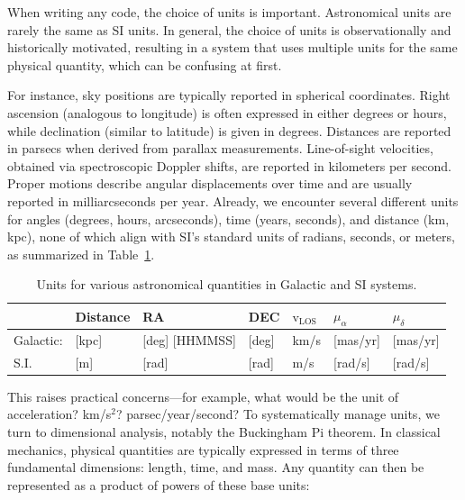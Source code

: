     When writing any code, the choice of units is important. Astronomical units are rarely the same as SI units. In general, the choice of units is observationally and historically motivated, resulting in a system that uses multiple units for the same physical quantity, which can be confusing at first.

    For instance, sky positions are typically reported in spherical coordinates. Right ascension (analogous to longitude) is often expressed in either degrees or hours, while declination (similar to latitude) is given in degrees. Distances are reported in parsecs when derived from parallax measurements. Line-of-sight velocities, obtained via spectroscopic Doppler shifts, are reported in kilometers per second. Proper motions describe angular displacements over time and are usually reported in milliarcseconds per year. Already, we encounter several different units for angles (degrees, hours, arcseconds), time (years, seconds), and distance (km, kpc), none of which align with SI’s standard units of radians, seconds, or meters, as summarized in Table~\ref{tab:units}.

    \begin{table}[]
        \caption{Units for various astronomical quantities in Galactic and SI systems.}
        \label{tab:units}
        \begin{tabular}{l|l|l|l|l|l|l|}
                            & Distance  & RA                     & DEC                    & \textbf{$\mathrm{v}_\mathrm{LOS}$} & $\mu_\alpha$ & $\mu_\delta$ \\ \hline
            Galactic: & {[}kpc{]} & {[}deg{]} {[}HHMMSS{]} & {[}deg{]}              & km/s                      & {[}mas/yr{]} & {[}mas/yr{]} \\ \hline
            S.I.       & {[}m{]}   & {[}rad{]}              & {[}rad{]}              & m/s                       & {[}rad/s{]}  & {[}rad/s{]}  \\ 
        \end{tabular}
    \end{table}

    This raises practical concerns—for example, what would be the unit of acceleration? km/s$^2$? parsec/year/second? To systematically manage units, we turn to dimensional analysis, notably the Buckingham Pi theorem. In classical mechanics, physical quantities are typically expressed in terms of three fundamental dimensions: length, time, and mass. Any quantity can then be represented as a product of powers of these base units:

